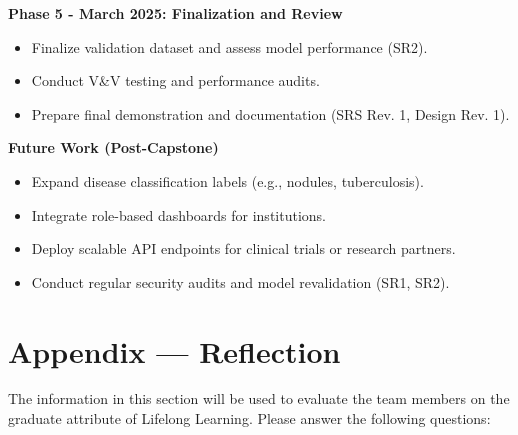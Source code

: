 \documentclass{article}
\begin{document}
\textbf{Phase 5 - March 2025: Finalization and Review}
\begin{itemize}
  \item Finalize validation dataset and assess model performance (SR2).
  \item Conduct V\&V testing and performance audits.
  \item Prepare final demonstration and documentation (SRS Rev. 1, Design Rev. 1).
\end{itemize}

\textbf{Future Work (Post-Capstone)}
\begin{itemize}
  \item Expand disease classification labels (e.g., nodules, tuberculosis).
  \item Integrate role-based dashboards for institutions.
  \item Deploy scalable API endpoints for clinical trials or research partners.
  \item Conduct regular security audits and model revalidation (SR1, SR2).
\end{itemize}


\newpage{}

\section*{Appendix --- Reflection}




The information in this section will be used to evaluate the team members on the
graduate attribute of Lifelong Learning. Please answer the following questions:
\end{document}
